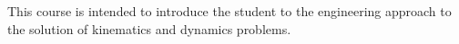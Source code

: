 {This course is intended to introduce the student to the engineering approach to the solution of kinematics and dynamics problems.}
